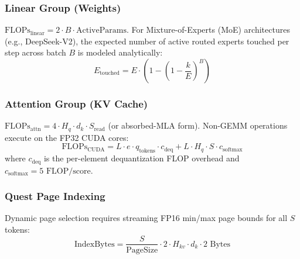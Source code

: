 \documentclass[conference,onecolumn]{IEEEtran}
\begin{document}
\subsubsection{Linear Group (Weights)}
$\text{FLOPs}_{\text{linear}} = 2 \cdot B \cdot \text{ActiveParams}$. For Mixture-of-Experts (MoE) architectures (e.g., DeepSeek-V2), the expected number of active routed experts touched per step across batch $B$ is modeled analytically:
\begin{equation}
E_{\text{touched}} = E \cdot \left(1 - \left(1 - \frac{k}{E}\right)^B\right)
\end{equation}

\subsubsection{Attention Group (KV Cache)}
$\text{FLOPs}_{\text{attn}} = 4 \cdot H_q \cdot d_k \cdot S_{\text{read}}$ (or absorbed-MLA form). Non-GEMM operations execute on the FP32 CUDA cores:
\begin{equation}
\text{FLOPs}_{\text{CUDA}} = L \cdot e \cdot q_{\text{tokens}} \cdot c_{\text{deq}} + L \cdot H_q \cdot S \cdot c_{\text{softmax}}
\end{equation}
where $c_{\text{deq}}$ is the per-element dequantization FLOP overhead and $c_{\text{softmax}} = 5\text{ FLOP/score}$.

\subsubsection{Quest Page Indexing}
Dynamic page selection requires streaming FP16 min/max page bounds for all $S$ tokens:
\begin{equation}
\text{IndexBytes} = \frac{S}{\text{PageSize}} \cdot 2 \cdot H_{kv} \cdot d_k \cdot 2\text{ Bytes}
\end{equation}
\end{document}
